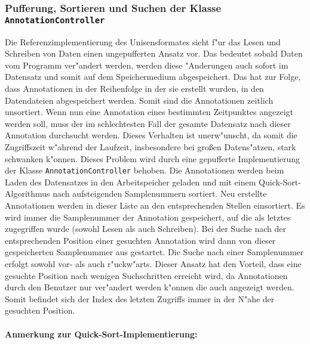 
\subsubsection{Pufferung, Sortieren und Suchen der Klasse \texttt{AnnotationController}}
\label{sec:anno_ctrl}

Die Referenzimplementierung des Unisensformates sieht f"ur das Lesen und Schreiben von Daten einen ungepufferten Ansatz vor.
Das bedeutet sobald Daten vom Programm ver"andert werden, werden diese "Anderungen auch sofort im Datensatz und somit auf dem Speichermedium abgespeichert.
Das hat zur Folge, dass Annotationen in der Reihenfolge in der sie erstellt wurden, in den Datendateien abgespeichert werden.
Somit sind die Annotationen zeitlich unsortiert.
Wenn nun eine Annotation eines bestimmten Zeitpunktes angezeigt werden soll, muss der im schlechtesten Fall der gesamte Datensatz nach dieser Annotation durchsucht werden.
Dieses Verhalten ist unerw"unscht, da somit die Zugriffszeit w"ahrend der Laufzeit, insbesondere bei gro\ss en Datens"atzen, stark schwanken k"onnen.
Dieses Problem wird durch eine gepufferte Implementierung der Klasse \verb|AnnotationController| behoben.
Die Annotationen werden beim Laden des Datensatzes in den Arbeitspeicher geladen und mit einem Quick-Sort-Algorithmus nach aufsteigenden Samplenummern sortiert.
Neu erstellte Annotationen werden in dieser Liste an den entsprechenden Stellen einsortiert.
Es wird immer die Samplenummer der Annotation gespeichert, auf die als letztes zugegriffen wurde (sowohl Lesen als auch Schreiben).
Bei der Suche nach der entsprechenden Position einer gesuchten Annotation wird dann von dieser gespeicherten Samplenummer aus gestartet.
Die Suche nach einer Samplenummer erfolgt sowohl vor- als auch r"uckw"arts.
Dieser Ansatz hat den Vorteil, dass eine gesuchte Position nach wenigen Suchschritten erreicht wird, da Annotationen durch den Benutzer nur ver"andert werden k"onnen die auch angezeigt werden.
Somit befindet sich der Index des letzten Zugriffs immer in der N"ahe der gesuchten Position.

\paragraph[{Anmerkung zur Quick-Sort-Implementierung}]{Anmerkung zur Quick-Sort-Implementierung:}

